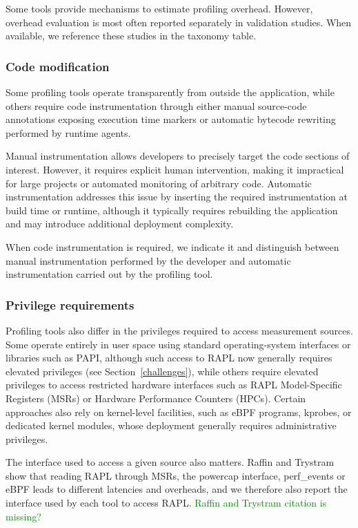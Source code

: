 \documentclass[
  acmsmall,
  screen,
  review,
  xcolor={dvipsnames,usenames}
]{acmart}
\newcommand{\iness}[1]{\textcolor{green}{#1}}
\begin{document}
Some tools provide mechanisms to estimate profiling overhead. However, overhead evaluation is most often reported separately in validation studies. When available, we reference these studies in the taxonomy table.

\subsubsection{\textbf{Code modification}}

Some profiling tools operate transparently from outside the application, while others require code instrumentation through either manual source-code annotations exposing execution time markers or automatic bytecode rewriting performed by runtime agents.

Manual instrumentation allows developers to precisely target the code sections of interest. However, it requires explicit human intervention, making it impractical for large projects or automated monitoring of arbitrary code. Automatic instrumentation addresses this issue by inserting the required instrumentation at build time or runtime, although it typically requires rebuilding the application and may introduce additional deployment complexity.

When code instrumentation is required, we indicate it and distinguish between manual instrumentation performed by the developer and automatic instrumentation carried out by the profiling tool.

\subsubsection{\textbf{Privilege requirements}}

Profiling tools also differ in the privileges required to access measurement sources. Some operate entirely in user space using standard operating-system interfaces or libraries such as PAPI, although such access to RAPL now generally requires elevated privileges (see Section~\ref{challenges}), while others require elevated privileges to access restricted hardware interfaces such as RAPL Model-Specific Registers (MSRs) or Hardware Performance Counters (HPCs). Certain approaches also rely on kernel-level facilities, such as eBPF programs, kprobes, or dedicated kernel modules, whose deployment generally requires administrative privileges.

The interface used to access a given source also matters. Raffin and Trystram \cite{raffinDissectingSoftwarebasedMeasurement2025} show that reading RAPL through MSRs, the powercap interface, perf\_events or eBPF leads to different latencies and overheads, and we therefore also report the interface used by each tool to access RAPL. \iness{Raffin and Trystram citation is missing?}
\end{document}
